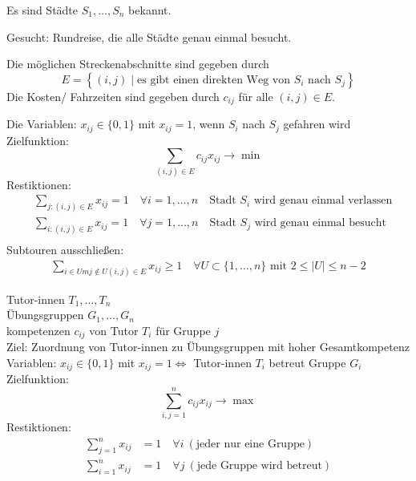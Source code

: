 \begin{beispiel}\enter
	Es sind Städte $S_{1},\dots, S_{n}$ bekannt.

	Gesucht: Rundreise, die alle Städte genau einmal besucht.

  Die möglichen Streckenabschnitte sind gegeben durch
	\begin{equation*}
		E = \left\{ (i,j) \mid \text{es gibt einen direkten Weg von $S_{i}$ nach $S_{j}$} \right\}
	\end{equation*}
	Die Kosten/ Fahrzeiten sind gegeben durch $c_{ij}$ für alle $(i,j) \in E$.

	Die Variablen: $x_{ij} \in \{0,1\}$ mit $x_{ij}=1$, wenn $S_{i}$ nach $S_j$ gefahren wird\\
	Zielfunktion:
	\begin{equation*}
		\sum_{(i,j)\in E}  c_{ij}x_{ij} \rightarrow \min
	\end{equation*}
	Restiktionen:
	\begin{align*}
		&\sum_{j:(i,j)\in E} x_{ij}=1 \quad \forall i = 1,\dots,n\quad \text{Stadt $S_{i}$ wird genau einmal verlassen}\\
		&\sum_{i:(i,j)\in E} x_{ij}=1 \quad \forall j = 1,\dots,n \quad\text{Stadt $S_{j}$ wird genau einmal besucht}\\
	\end{align*}
	Subtouren ausschließen:
	\begin{align*}
		\sum_{i\in Um j \not\in U (i,j) \in E} x_{ij} \geq 1 \quad \forall U \subset \{1,\dots,n\} \text{ mit }2\leq |U|\leq n-2
	\end{align*}
\end{beispiel}

\begin{beispiel}\enter
	Tutor-innen $T_{1},\dots,T_{n}$ \\
	Übungsgruppen $G_{1},\dots, G_{n}$ \\
	kompetenzen $c_{ij}$ von Tutor $T_{i}$ für Gruppe $j$\\
	Ziel: Zuordnung von Tutor-innen zu Übungsgruppen mit hoher Gesamtkompetenz\\
	Variablen: $x_{ij}\in \{0,1\}$ mit $x_{ij}=1 \iff$ Tutor-innen $T_{i}$ betreut Gruppe $G_{i}$ \\
	Zielfunktion:
	\begin{equation*}
		\sum_{i,j=1}^{n}  c_{ij}x_{ij} \rightarrow \max
	\end{equation*}
	Restiktionen:
	\begin{align*}
		\sum_{j=1}^{n} x_{ij} &= 1\quad \forall i\ (\text{jeder nur eine Gruppe})\\
		\sum_{i=1}^{n} x_{ij} &= 1\quad \forall j\ (\text{jede Gruppe wird betreut})
	\end{align*}
\end{beispiel}


